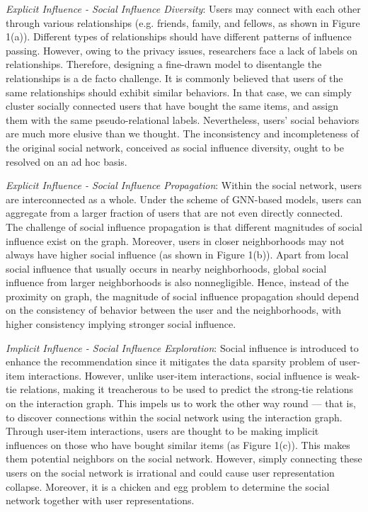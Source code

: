 \documentclass[letterpaper]{article} %
\begin{document}
\textit{Explicit Influence \uppercase\expandafter{} - Social Influence Diversity}: Users may connect with each other through various relationships (e.g. friends, family, and fellows, as shown in Figure 1(a)). Different types of relationships should have different patterns of influence passing. However, owing to the privacy issues, researchers face a lack of labels on relationships. Therefore, designing a fine-drawn model to disentangle the relationships is a de facto challenge. It is commonly believed that users of the same relationships should exhibit similar behaviors. In that case, we can simply cluster socially connected users that have bought the same items, and assign them with the same pseudo-relational labels. Nevertheless, users' social behaviors are much more elusive than we thought. The inconsistency and incompleteness of the original social network, conceived as social influence diversity, ought to be resolved on an ad hoc basis.

\textit{Explicit Influence \uppercase\expandafter{} - Social Influence Propagation}: Within the social network, users are interconnected as a whole. Under the scheme of GNN-based models, users can aggregate from a larger fraction of users that are not even directly connected. The challenge of social influence propagation is that different magnitudes of social influence exist on the graph. Moreover, users in closer neighborhoods may not always have higher social influence (as shown in Figure 1(b)). Apart from local social influence that usually occurs in nearby neighborhoods, global social influence from larger neighborhoods is also nonnegligible. Hence, instead of the proximity on graph, the magnitude of social influence propagation should depend on the consistency of behavior between the user and the neighborhoods, with higher consistency implying stronger social influence.

\textit{Implicit Influence - Social Influence Exploration}: Social influence is introduced to enhance the recommendation since it mitigates the data sparsity problem of user-item interactions. However, unlike user-item interactions, social influence is weak-tie relations, making it treacherous to be used to predict the strong-tie relations on the interaction graph. This impels us to work the other way round --- that is, to discover connections within the social network using the interaction graph. Through user-item interactions, users are thought to be making implicit influences on those who have bought similar items (as Figure 1(c)). This makes them potential neighbors on the social network. However, simply connecting these users on the social network is irrational and could cause user representation collapse. Moreover, it is a chicken and egg problem to determine the social network together with user representations.
\end{document}
